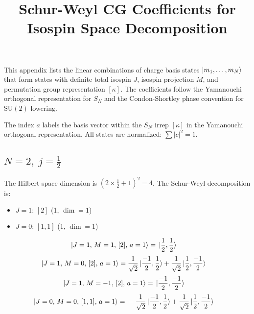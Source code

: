 \documentclass{article}
\title{Schur-Weyl CG Coefficients for Isospin Space Decomposition}
\author{}
\date{}
\begin{document}
\maketitle

This appendix lists the linear combinations of charge basis states
$\ket{m_1,\ldots,m_N}$ that form states with definite total isospin $J$,
isospin projection $M$, and permutation group representation $[\kappa]$.
The coefficients follow the Yamanouchi orthogonal representation for $S_N$
and the Condon-Shortley phase convention for $\mathrm{SU}(2)$ lowering.

The index $a$ labels the basis vector within the $S_N$ irrep $[\kappa]$
in the Yamanouchi orthogonal representation. All states are normalized:
$\sum |c|^2 = 1$.

\subsection*{$N=2,\; j=\frac{1}{2}$}

The Hilbert space dimension is $(2\times \frac{1}{2} +1)^{2}=4$.
The Schur-Weyl decomposition is:
\begin{itemize}
  \item $J=1$: $[2]$ (1, $\dim = 1$)
  \item $J=0$: $[1,1]$ (1, $\dim = 1$)
\end{itemize}

\begin{equation*}
\begin{aligned}
\ket{J=1,\,M=1,\,[2],\,a=1} = \; &\ket{\frac{1}{2},\frac{1}{2}}
\end{aligned}
\end{equation*}
\begin{equation*}
\begin{aligned}
\ket{J=1,\,M=0,\,[2],\,a=1} = \; &\frac{1}{\sqrt{2}} \ket{\frac{-1}{2},\frac{1}{2}} + \frac{1}{\sqrt{2}} \ket{\frac{1}{2},\frac{-1}{2}}
\end{aligned}
\end{equation*}
\begin{equation*}
\begin{aligned}
\ket{J=1,\,M=-1,\,[2],\,a=1} = \; &\ket{\frac{-1}{2},\frac{-1}{2}}
\end{aligned}
\end{equation*}
\begin{equation*}
\begin{aligned}
\ket{J=0,\,M=0,\,[1,1],\,a=1} = \; &- \frac{1}{\sqrt{2}} \ket{\frac{-1}{2},\frac{1}{2}} + \frac{1}{\sqrt{2}} \ket{\frac{1}{2},\frac{-1}{2}}
\end{aligned}
\end{equation*}
\end{document}
